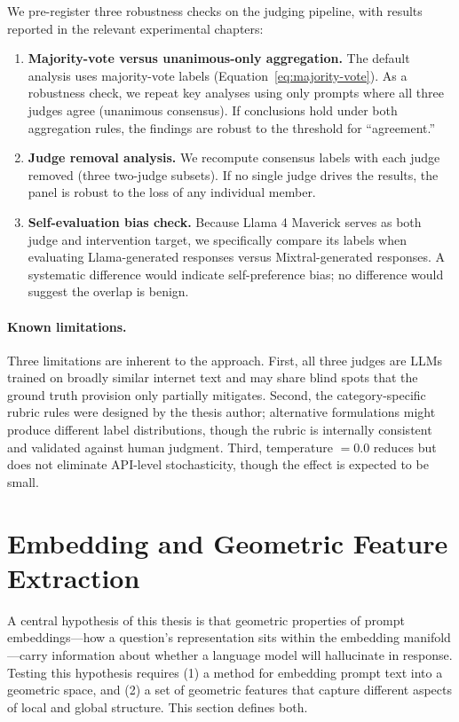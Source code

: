 We pre-register three robustness checks on the judging pipeline, with results reported in the relevant experimental chapters:

\begin{enumerate}
    \item \textbf{Majority-vote versus unanimous-only aggregation.} The default analysis uses majority-vote labels (Equation~\ref{eq:majority-vote}). As a robustness check, we repeat key analyses using only prompts where all three judges agree (unanimous consensus). If conclusions hold under both aggregation rules, the findings are robust to the threshold for ``agreement.''
    \item \textbf{Judge removal analysis.} We recompute consensus labels with each judge removed (three two-judge subsets). If no single judge drives the results, the panel is robust to the loss of any individual member.
    \item \textbf{Self-evaluation bias check.} Because Llama 4 Maverick serves as both judge and intervention target, we specifically compare its labels when evaluating Llama-generated responses versus Mixtral-generated responses. A systematic difference would indicate self-preference bias; no difference would suggest the overlap is benign.
\end{enumerate}

\paragraph{Known limitations.} Three limitations are inherent to the approach. First, all three judges are LLMs trained on broadly similar internet text and may share blind spots that the ground truth provision only partially mitigates. Second, the category-specific rubric rules were designed by the thesis author; alternative formulations might produce different label distributions, though the rubric is internally consistent and validated against human judgment. Third, temperature $= 0.0$ reduces but does not eliminate API-level stochasticity, though the effect is expected to be small.

\section{Embedding and Geometric Feature Extraction}
\label{sec:embeddings}

A central hypothesis of this thesis is that geometric properties of prompt embeddings---how a question's representation sits within the embedding manifold---carry information about whether a language model will hallucinate in response. Testing this hypothesis requires (1) a method for embedding prompt text into a geometric space, and (2) a set of geometric features that capture different aspects of local and global structure. This section defines both.

